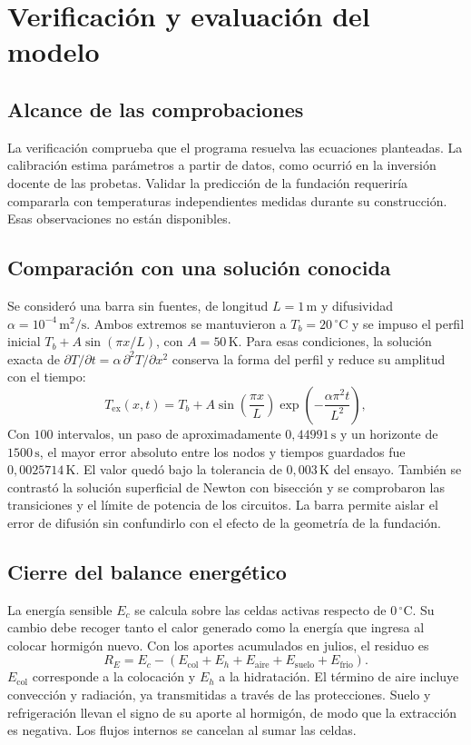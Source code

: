 \section{Verificación y evaluación del modelo}
\label{sec:verificacion-evaluacion}

\subsection{Alcance de las comprobaciones}
La verificación comprueba que el programa resuelva las ecuaciones planteadas. La calibración estima parámetros a partir de datos, como ocurrió en la inversión docente de las probetas. Validar la predicción de la fundación requeriría compararla con temperaturas independientes medidas durante su construcción. Esas observaciones no están disponibles.

\subsection{Comparación con una solución conocida}
Se consideró una barra sin fuentes, de longitud $L=1\,\mathrm m$ y difusividad $\alpha=10^{-4}\,\mathrm{m^2/s}$. Ambos extremos se mantuvieron a $T_b=20\,^\circ\mathrm C$ y se impuso el perfil inicial $T_b+A\sin(\pi x/L)$, con $A=50\,\mathrm K$. Para esas condiciones, la solución exacta de $\partial T/\partial t=\alpha\,\partial^2T/\partial x^2$ conserva la forma del perfil y reduce su amplitud con el tiempo:
\begin{equation}
  T_{\mathrm{ex}}(x,t)=T_b+A\sin\left(\frac{\pi x}{L}\right)
  \exp\left(-\frac{\alpha\pi^2t}{L^2}\right),
  \label{eq:caso-seno-verificacion}
\end{equation}
Con $100$ intervalos, un paso de aproximadamente $0{,}44991\,\mathrm s$ y un horizonte de $1500\,\mathrm s$, el mayor error absoluto entre los nodos y tiempos guardados fue $0{,}0025714\,\mathrm K$. El valor quedó bajo la tolerancia de $0{,}003\,\mathrm K$ del ensayo. También se contrastó la solución superficial de Newton con bisección y se comprobaron las transiciones y el límite de potencia de los circuitos. La barra permite aislar el error de difusión sin confundirlo con el efecto de la geometría de la fundación.

\subsection{Cierre del balance energético}
La energía sensible $E_c$ se calcula sobre las celdas activas respecto de $0\,^\circ\mathrm C$. Su cambio debe recoger tanto el calor generado como la energía que ingresa al colocar hormigón nuevo. Con los aportes acumulados en julios, el residuo es
\begin{equation}
  R_E=E_c-\left(E_{\mathrm{col}}+E_h+E_{\mathrm{aire}}
  +E_{\mathrm{suelo}}+E_{\mathrm{frio}}\right).
  \label{eq:residuo-energia-verificacion}
\end{equation}
$E_{\mathrm{col}}$ corresponde a la colocación y $E_h$ a la hidratación. El término de aire incluye convección y radiación, ya transmitidas a través de las protecciones. Suelo y refrigeración llevan el signo de su aporte al hormigón, de modo que la extracción es negativa. Los flujos internos se cancelan al sumar las celdas.

